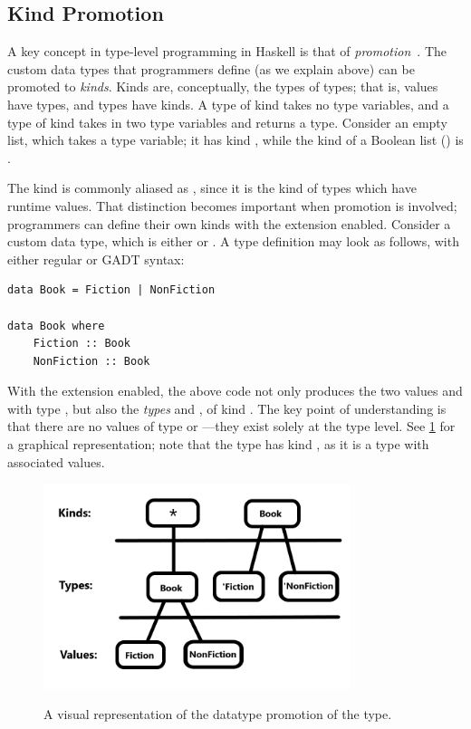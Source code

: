 \subsection{Kind Promotion} \label{promotionsection}

A key concept in type-level programming in Haskell is that of \emph{promotion}~\cite{givingpromotion}. The custom data types that programmers define (as we explain above) can be promoted to \emph{kinds}. Kinds are, conceptually, the types of types; that is, values have types, and types have kinds. A type of kind \inline{*} takes no type variables, and a type of kind \inline{* -> * -> *} takes in two type variables and returns a type. Consider an empty list, which takes a type variable; it has kind \inline{* -> *}, while the kind of a Boolean list (\inline{[Bool]}) is \inline{*}.

The kind \inline{*} is commonly aliased as , since it is the kind of types which have runtime values. That distinction becomes important when promotion is involved; programmers can define their own kinds with the  extension enabled. Consider a custom  data type, which is either  or . A type definition may look as follows, with either regular or GADT syntax:

\begin{lstlisting}
data Book = Fiction | NonFiction

data Book where
    Fiction :: Book
    NonFiction :: Book
\end{lstlisting}

With the  extension enabled, the above code not only produces the two values  and  with type , but also the \emph{types}  and , of kind . The key point of understanding is that there are no values of type  or ---they exist solely at the type level. See \cref{promotiondiagram} for a graphical representation; note that the type  has kind \inline{*}, as it is a type with associated values.

\begin{figure}
    \centering
    \includegraphics[width=0.8\textwidth,keepaspectratio]{Promotion.png}
    \label{promotiondiagram}
    \caption{A visual representation of the datatype promotion of the  type.}
\end{figure}

